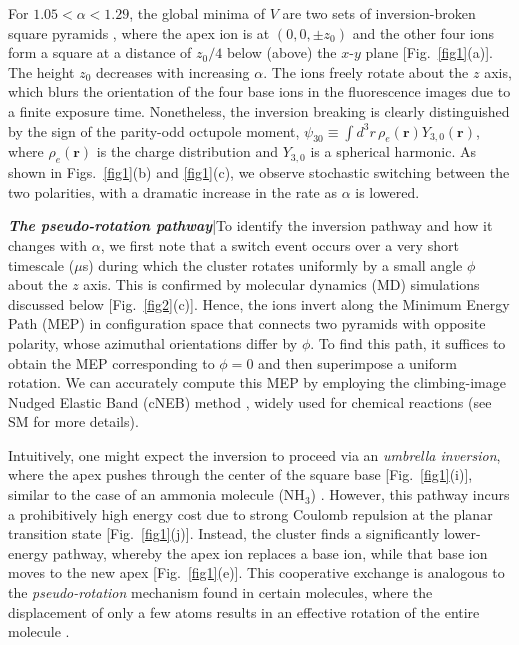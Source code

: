 \documentclass[aps,prl,twocolumn,superscriptaddress,showpacs,floatfix]{revtex4-2}
\begin{document}
For $1.05< \alpha < 1.29$, the global minima of $V$ are two sets of inversion-broken square pyramids \cite{ayyadevara2025}, where the apex ion is at $(0,0,\pm z_0)$ and the other four ions form a square at a distance of $z_0/4$ below (above) the $x$-$y$ plane [Fig.~\ref{fig1}(a)]. The height $z_0$ decreases with increasing $\alpha$. The ions freely rotate about the $z$ axis, which blurs the orientation of the four base ions in the fluorescence images due to a finite exposure time. Nonetheless, the inversion breaking is clearly distinguished by the sign of the parity-odd octupole moment, $\psi_{30} \equiv \int d^3 r \, \rho_e(\mathbf{r}) Y_{3,0}(\mathbf{r})$, where $\rho_e(\mathbf{r})$ is the charge distribution and $Y_{3,0}$ is a spherical harmonic. As shown in Figs.~\ref{fig1}(b) and \ref{fig1}(c), we observe stochastic switching between the two polarities, with a dramatic increase in the rate as $\alpha$ is lowered.

{\it \textbf{The pseudo-rotation pathway}}|To identify the inversion pathway and how it changes with $\alpha$, we first note that a switch event occurs over a very short timescale ($\mu$s) during which the cluster rotates uniformly by a small angle $\phi$ about the $z$ axis. This is confirmed by molecular dynamics (MD) simulations discussed below [Fig.~\ref{fig2}(c)]. Hence, the ions invert along the Minimum Energy Path (MEP) in configuration space that connects two pyramids with opposite polarity, whose azimuthal orientations differ by $\phi$. To find this path, it suffices to obtain the MEP corresponding to $\phi=0$ and then superimpose a uniform rotation. We can accurately compute this MEP by employing the climbing-image Nudged Elastic Band (cNEB) method \cite{Henkelman_NEB}, widely used for chemical reactions (see SM \cite{supp} for more details).

Intuitively, one might expect the inversion to proceed via an {\it umbrella inversion}, where the apex pushes through the center of the square base [Fig.~\ref{fig1}(i)], similar to the case of an ammonia molecule (NH$_3$) \cite{Lehn_1970}. However, this pathway incurs a prohibitively high energy cost due to strong Coulomb repulsion at the planar transition state [Fig.~\ref{fig1}(j)]. Instead, the cluster finds a significantly lower-energy pathway, whereby the apex ion replaces a base ion, while that base ion moves to the new apex [Fig.~\ref{fig1}(e)]. This cooperative exchange is analogous to the \textit{pseudo-rotation} mechanism found in certain molecules, where the displacement of only a few atoms results in an effective rotation of the entire molecule \cite{Berry_1960}.
\end{document}
